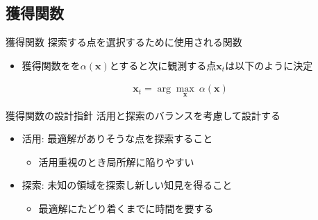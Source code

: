\documentclass[dvipdfmx, 10.5pt]{beamer}
\begin{document}
\subsection{獲得関数}
\begin{frame}{\insertsubsection}
	\begin{block}{獲得関数}
		探索する点を選択するために使用される関数 %
	\end{block}
	\begin{itemize}
		\item 獲得関数をを$\alpha(\bm x)$とすると次に観測する点$\bm x_t$は以下のように決定
	\end{itemize}
	\begin{align*}
		\bm x_t = \arg \max_{\bm x} ~ \alpha(\bm x)
	\end{align*}
	\begin{block}{獲得関数の設計指針}
		\textcolor{myorange}{活用と探索のバランス}を考慮して設計する
	\end{block}
	\begin{itemize}
		\item 活用: 最適解がありそうな点を探索すること
		\begin{itemize}
			\item 活用重視のとき局所解に陥りやすい
		\end{itemize}
		\vspace{3pt}
		\item 探索: 未知の領域を探索し新しい知見を得ること
		\begin{itemize}
			\item 最適解にたどり着くまでに時間を要する
		\end{itemize}
	\end{itemize}

\end{frame}

\end{document}
